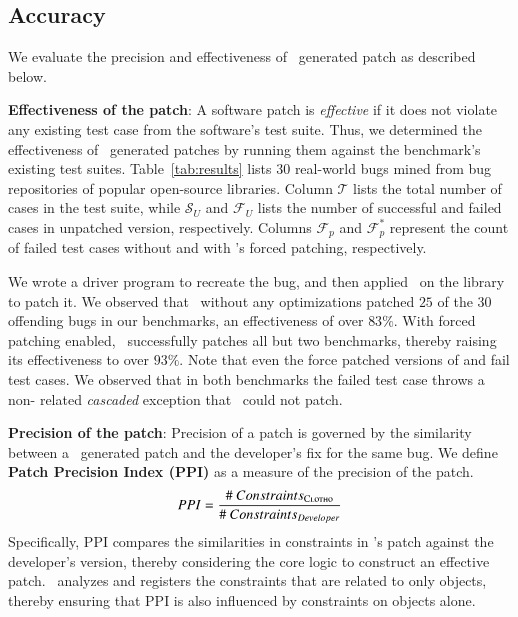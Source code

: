 \subsection{Accuracy}
\label{sub:accuracy}

We evaluate the precision and effectiveness of \tool\ generated patch as
described below.

\begin{mylist}

\item \textbf{Effectiveness of the patch}: A software patch is \emph{effective}
if it does not violate any existing test case from the software's test suite.
Thus, we determined the effectiveness of \tool\ generated patches by running
them against the benchmark's existing test suites. Table~\ref{tab:results} lists
$30$ real-world bugs mined from bug repositories of popular open-source
libraries. Column $\mathcal{T}$ lists the total number of cases in the test
suite, while $\mathcal{S}_{U}$ and $\mathcal{F}_{U}$ lists the number of
successful and failed cases in unpatched version, respectively. Columns
$\mathcal{F}_{p}$ and $\mathcal{F}_{p}^{*}$ represent the count of failed test
cases without and with \tool{}'s forced patching,
respectively.

We wrote a driver program to recreate the bug, and then applied \tool\ on the
library to patch it. We observed that \tool\ without any optimizations patched
$25$ of the $30$ offending bugs in our benchmarks, an effectiveness of over
$83\%$. With forced patching enabled,
\tool\ successfully patches all but two benchmarks, thereby raising its
effectiveness to over $93\%$. Note that even the force patched versions of
 and  fail test cases. We observed
that in both benchmarks the failed test case throws a non-
related \textit{cascaded} exception that \tool\ could not patch.

\item \textbf{Precision of the patch}: Precision of a patch is governed by the
similarity between a \tool\ generated patch and the developer's fix for the same
bug. We define \textbf{Patch Precision Index (PPI)} as a measure of the
precision of the patch. $$PPI =
\frac{\#~Constraints_{\textsc{Clotho}}}{\#~Constraints_{Developer}}$$ Specifically, PPI
compares the similarities in constraints in \tool's patch
against the developer's version, thereby considering the core logic to construct
an effective patch. \tool\ analyzes and registers the constraints that are
related to only  objects, thereby ensuring that PPI is also
influenced by constraints on  objects alone.


\end{mylist}

